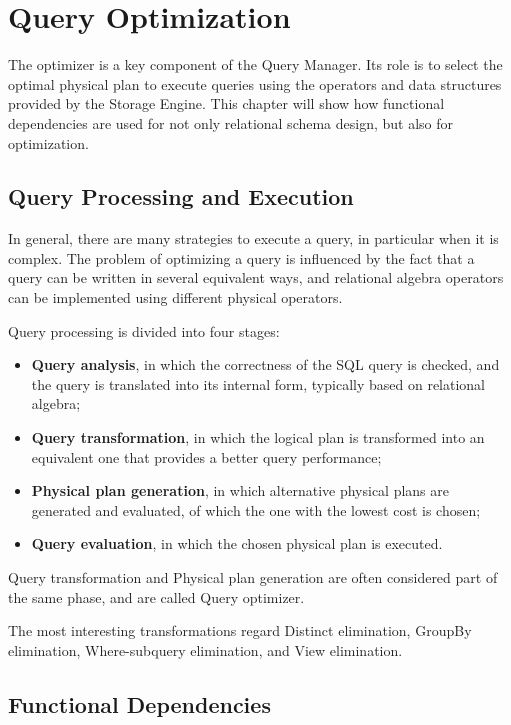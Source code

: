 \chapter{Query Optimization}

The optimizer is a key component of the Query Manager. Its role is to select the optimal physical plan to execute queries using the operators and data structures provided by the Storage Engine. This chapter will show how functional dependencies are used for not only relational schema design, but also for optimization.

\section{Query Processing and Execution}

In general, there are many strategies to execute a query, in particular when it is complex. The problem of optimizing a query is influenced by the fact that a query can be written in several equivalent ways, and relational algebra operators can be implemented using different physical operators.

Query processing is divided into four stages:
\begin{itemize}
    \item \textbf{Query analysis}, in which the correctness of the SQL query is checked, and the query is translated into its internal form, typically based on relational algebra;

    \item \textbf{Query transformation}, in which the logical plan is transformed into an equivalent one that provides a better query performance;

    \item \textbf{Physical plan generation}, in which alternative physical plans are generated and evaluated, of which the one with the lowest cost is chosen;

    \item \textbf{Query evaluation}, in which the chosen physical plan is executed.
\end{itemize}
Query transformation and Physical plan generation are often considered part of the same phase, and are called Query optimizer.

The most interesting transformations regard Distinct elimination, GroupBy elimination, Where-subquery elimination, and View elimination.

\section{Functional Dependencies}

